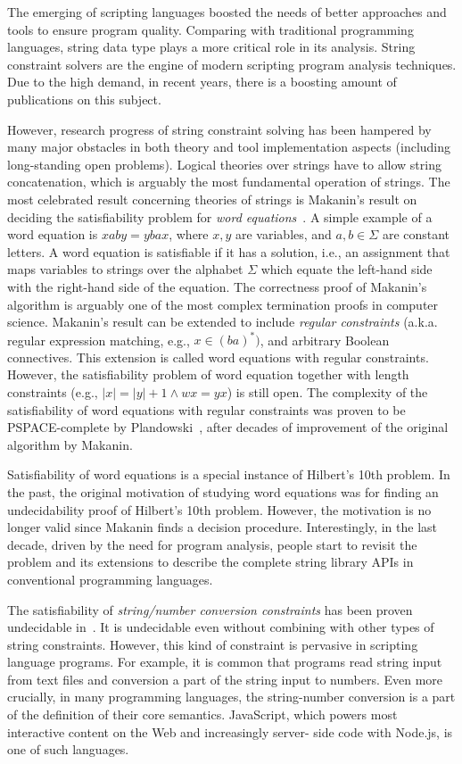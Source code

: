 The emerging of scripting languages boosted the needs of better approaches and tools to ensure program quality.
Comparing with traditional programming languages, string data type plays a more critical role in its analysis.
String constraint solvers are the engine of modern scripting program analysis techniques. 
Due to the high demand, in recent years, there is a boosting amount of publications on this subject.

However, research progress of string constraint solving has been hampered by many major obstacles in both theory and tool implementation aspects (including long-standing open problems). 
Logical theories over strings have to allow string concatenation, which is arguably the most fundamental operation of strings. 
The most celebrated result concerning theories of strings is Makanin’s result on deciding the satisfiability problem for \emph{word equations}~\cite{}.
A simple example of a word equation is $xaby = ybax$, where $x, y$ are variables, and $a, b \in \Sigma$ are constant letters. 
A word equation is satisfiable if it has a solution, i.e., an assignment that maps variables to strings over the alphabet $\Sigma$ which equate the left-hand side with the right-hand side of the equation.
The correctness proof of Makanin’s algorithm is arguably one of the most complex termination proofs in computer science. 
Makanin’s result can be extended to include \emph{regular constraints} (a.k.a. regular expression matching, e.g., $x \in (ba)^*)$, and arbitrary Boolean connectives.
This extension is called word equations with regular constraints. 
However, the satisfiability problem of word equation together with length constraints (e.g., $|x|=|y|+1 \wedge wx=yx$) is still open.
The complexity of the satisfiability of word equations with regular constraints was proven to be PSPACE-complete by Plandowski~\cite{}, after decades of improvement of the original algorithm by Makanin.

Satisfiability of word equations is a special instance of Hilbert’s 10th problem. 
In the past, the original motivation of studying word equations was for finding an undecidability proof of Hilbert’s 10th problem. 
However, the motivation is no longer valid since Makanin finds a decision procedure. Interestingly, in the last decade, driven by the need for program analysis, people start to revisit the problem and its extensions to describe the complete string library APIs in conventional programming languages.

The satisfiability of \emph{string/number conversion constraints}  has been proven undecidable in~\cite{}. 
It is undecidable even without combining with other types of string constraints. 
However, this kind of constraint is pervasive in scripting language programs. 
For example, it is common that programs read string input from text files and conversion a part of the string input to numbers.
Even more crucially, in many programming languages, the string-number conversion is a part of the definition of their core semantics. 
JavaScript, which powers most interactive content on the Web and increasingly server- side code with Node.js, is one of such languages. 

